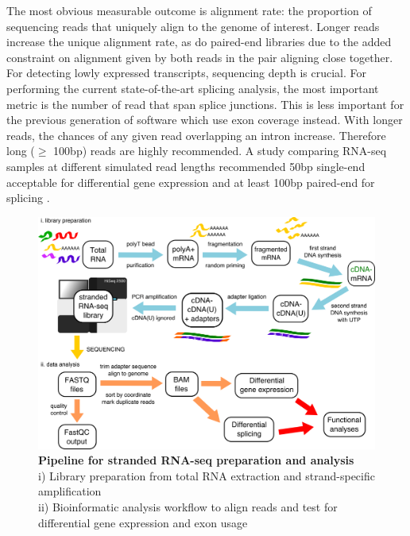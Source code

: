 The most obvious measurable outcome is alignment rate: the proportion of sequencing reads that uniquely align to the genome of interest. 
Longer reads increase the unique alignment rate, as do paired-end libraries due to the added constraint on alignment given by both reads in the pair aligning close together. 
For detecting lowly expressed transcripts, sequencing depth is crucial. 
For performing the current state-of-the-art splicing analysis, the most important metric is the number of read that span splice junctions. 
This is less important for the previous generation of software which use exon coverage instead.
With longer reads, the chances of any given read overlapping an intron increase. 
Therefore long ($\geq$ 100bp) reads are highly recommended.
A study comparing RNA-seq samples at different simulated read lengths recommended 50bp single-end acceptable for differential gene expression and at least 100bp paired-end for splicing \citep{Chhangawala2015}. %


\begin{figure}[h!]
	\begin{center}
		\includegraphics[width=14cm]{Figures/02_methods/RNAseq_pipeline_schematic.png}
	\end{center}
	\caption[Pipeline for stranded RNA-seq preparation and analysis]{
		\textbf{Pipeline for stranded RNA-seq preparation and analysis}\\
	i) Library preparation from total RNA extraction and strand-specific amplification\\
	ii) Bioinformatic analysis workflow to align reads and test for differential gene expression and exon usage
	}
\end{figure}

